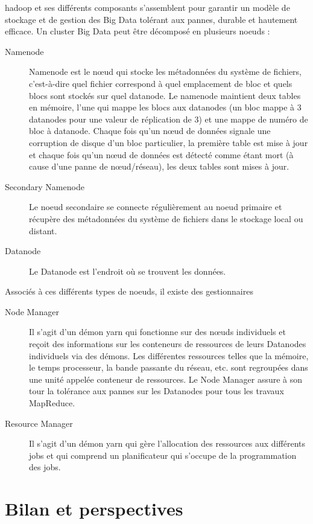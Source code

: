 \documentclass[12pt, french]{report}
\begin{document}
\gls{hadoop} et ses différents composants s'assemblent pour garantir un modèle de stockage et de gestion des Big Data tolérant aux pannes, durable et hautement efficace. Un cluster Big Data peut être décomposé en plusieurs noeuds :

\begin{description}
  \item[Namenode] Namenode est le nœud qui stocke les métadonnées du système de fichiers, c'est-à-dire quel fichier correspond à quel emplacement de bloc et quels blocs sont stockés sur quel datanode. Le namenode maintient deux tables en mémoire, l'une qui mappe les blocs aux datanodes (un bloc mappe à 3 datanodes pour une valeur de réplication de 3) et une mappe de numéro de bloc à datanode. Chaque fois qu'un nœud de données signale une corruption de disque d'un bloc particulier, la première table est mise à jour et chaque fois qu'un nœud de données est détecté comme étant mort (à cause d'une panne de nœud/réseau), les deux tables sont mises à jour.
  \item[Secondary Namenode] Le noeud secondaire se connecte régulièrement au noeud primaire et récupère des métadonnées du système de fichiers dans le stockage local ou distant.
  \item[Datanode] Le Datanode est l'endroit où se trouvent les données.
\end{description}
Associés à ces différents types de noeuds, il existe des gestionnaires
\begin{description}
  \item[Node Manager] Il s'agit d'un démon yarn qui fonctionne sur des nœuds individuels et reçoit des informations sur les conteneurs de ressources de leurs Datanodes individuels via des démons. Les différentes ressources telles que la mémoire, le temps processeur, la bande passante du réseau, etc. sont regroupées dans une unité appelée conteneur de ressources. Le Node Manager assure à son tour la tolérance aux pannes sur les Datanodes pour tous les travaux MapReduce.
  \item[Resource Manager] Il s'agit d'un démon yarn qui gère l'allocation des ressources aux différents jobs et qui comprend un planificateur qui s'occupe de la programmation des jobs.
\end{description}

\chapter*{Bilan et perspectives}
\end{document}
